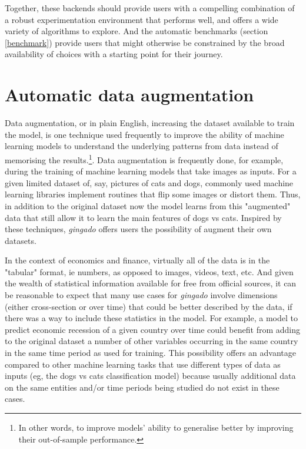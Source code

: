 \documentclass{article}
\begin{document}
Together, these backends should provide users with a compelling combination of a robust experimentation environment that performs well, and offers a wide variety of algorithms to explore. And the automatic benchmarks (section \ref{benchmark}) provide users that might otherwise be constrained by the broad availability of choices with a starting point for their journey.

\section{Automatic data augmentation}\label{augmentation}
Data augmentation, or in plain English, increasing the dataset available to train the model, is one technique used frequently to improve the ability of machine learning models to understand the underlying patterns from data instead of memorising the results.\footnote{In other words, to improve models' ability to generalise better by improving their out-of-sample performance.}. Data augmentation is frequently done, for example, during the training of machine learning models that take images as inputs. For a given limited dataset of, say, pictures of cats and dogs, commonly used machine learning libraries implement routines that flip some images or distort them. Thus, in addition to the original dataset now the model learns from this "augmented" data that still allow it to learn the main features of dogs vs cats. Inspired by these techniques, \textit{gingado} offers users the possibility of augment their own datasets.

In the context of economics and finance, virtually all of the data is in the "tabular" format, ie numbers, as opposed to images, videos, text, etc. And given the wealth of statistical information available for free from official sources, it can be reasonable to expect that many use cases for \textit{gingado} involve dimensions (either cross-section or over time) that could be better described by the data, if there was a way to include these statistics in the model. For example, a model to predict economic recession of a given country over time could benefit from adding to the original dataset a number of other variables occurring in the same country in the same time period as used for training. This possibility offers an advantage compared to other machine learning tasks that use different types of data as inputs (eg, the dogs vs cats classification model) because usually additional data on the same entities and/or time periods being studied do not exist in these cases.
\end{document}

